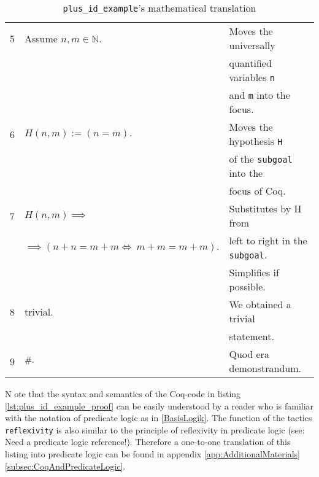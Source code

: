\begin{table}[h]
\begin{center}
\begin{tabular}{|c|l|l|}
	          5         & Assume $n,m \in \mathbb{N}.$        & Moves the universally     \\
	                    &                                     & quantified  variables \lstinline!n!      \\   
	                    &                                     & and \lstinline!m! into the focus.\\     \hline  
	          6         & $H(n,m) :=(n=m).$                 & Moves the hypothesis \lstinline!H! \\ 
	    	                &                                     & of the \lstinline!subgoal! into the    \\   
	    	                &                                     & focus of Coq.\\ \hline 
	          7         & $H(n,m)\implies $                   & Substitutes by H from \\  
	     	            & $\implies( n+n = m+m \Leftrightarrow\ m+m = m+m).$
	     	                    	                              & left to right in the \lstinline!subgoal!.\\
                        &     	                              & Simplifies if possible. \\ \hline
	     	  8         & trivial.                             & We obtained a trivial                 \\ 
	     	            &                                      &  statement. \\ \hline
	    	      9        & $\qed.$                               &  Quod era demonstrandum.  \\  \hline
	    	   	 \end{tabular}
	    	   	   \caption{\lstinline!plus_id_example!'s mathematical translation}
	    	   	   \label{tab:aMathematicalTranslation}  
	         \end{center}          
          \end{table}  
       N	ote that the syntax and semantics of the Coq-code in listing \ref{lst:plus_id_example_proof} can be easily understood by a reader who is familiar with the notation of predicate logic as in \ref{BasisLogik}. 
       The function of the tactics \lstinline!reflexivity! is also similar to the principle of reflexivity in predicate logic (see:  Need a predicate logic reference!). 
       Therefore a one-to-one translation of this listing into predicate logic can be found in appendix \ref{app:AdditionalMaterials} \ref{subsec:CoqAndPredicateLogic}.  \\      
         
